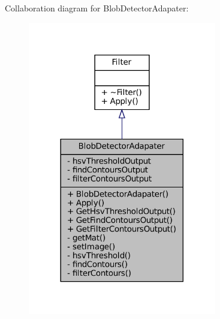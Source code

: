 Collaboration diagram for Blob\+Detector\+Adapater\+:\nopagebreak
\begin{figure}[H]
\begin{center}
\leavevmode
\includegraphics[width=233pt]{classBlobDetectorAdapater__coll__graph}
\end{center}
\end{figure}
